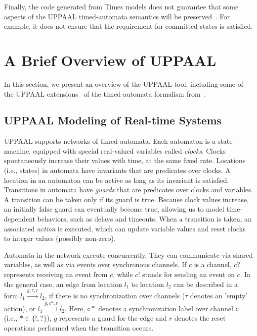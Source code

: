Finally, the code generated from Times models does not guarantee that some aspects of the UPPAAL timed-automata semantics will be preserved~\cite{anaheed}. For example, it does not ensure that the requirement for committed states is satisfied. 


\section{A Brief Overview of UPPAAL}
\label{sec:uppaal}

In this section, we present an overview of the UPPAAL tool, including some of the UPPAAL extensions~\cite{uppaal,uppaal_tut,uppaal_wang} of the timed-automata formalism from~\cite{timed-aut}. 

\subsection{UPPAAL Modeling of Real-time Systems}

UPPAAL supports networks of timed automata. Each automaton is a state machine, equipped with special real-valued variables called \textit{clocks}. Clocks spontaneously increase their values with time, at the same fixed rate. Locations (i.e., states) in automata have invariants that are predicates over clocks. A location in an automaton can be active as long as its invariant is satisfied. Transitions in automata have \textit{guards} that are predicates over clocks and variables.  A transition can be taken only if its guard is true.  Because clock values increase, an initially false guard can eventually become true, allowing us to model time-dependent behaviors, such as delays and timeouts.  When a transition is taken, an associated \textit{action} is executed, which can update variable values and reset clocks to integer values (possibly non-zero). 

Automata in the network execute concurrently. They can communicate via shared variables, as well as via events over synchronous channels.  If $c$ is a channel, $c?$ represents receiving an event from $c$, while $c!$ stands for sending an event on $c$. 
In the general case, an edge from location $l_1$ to location $l_2$ can be described in a form 
$
l_1 \xrightarrow{g,\tau,r} l_2
$, 
if there is no synchronization over channels ($\tau$ denotes an 'empty' action), or
$
l_1 \xrightarrow{g,c*,r} l_2
$.
Here, $c*$ denotes a synchronization label over channel $c$ (i.e., $*\in\{!,?\}$), $g$ represents a guard for the edge and $r$ denotes the reset operations performed when the transition occurs. 



